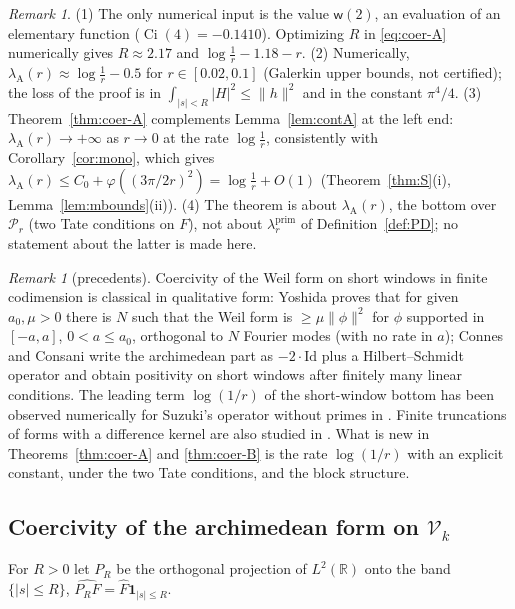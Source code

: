 \documentclass[11pt]{amsart}
\theoremstyle{definition}
\theoremstyle{remark}
\newtheorem{remark}[theorem]{Remark}
\newcommand{\R}{\mathbb R}
\newcommand{\Fh}{\widehat F}
\begin{document}
\begin{remark}\label{rem:coer-A}
(1) The only numerical input is the value $\mathsf w(2)$, an evaluation of an elementary function
($\operatorname{Ci}(4)=-0.1410$). Optimizing $R$ in \eqref{eq:coer-A} numerically gives $R\approx2.17$ and
$\log\frac1r-1.18-r$. (2) Numerically, $\lambda_{\mathrm A}(r)\approx\log\frac1r-0.5$ for $r\in[0.02,0.1]$ (Galerkin upper
bounds, not certified); the loss of the proof is in $\int_{|s|<R}|H|^2\le\|h\|^2$ and in the constant $\pi^4/4$.
(3) Theorem~\ref{thm:coer-A} complements Lemma~\ref{lem:contA} at the left end: $\lambda_{\mathrm A}(r)\to+\infty$ as $r\to0$ at
the rate $\log\frac1r$, consistently with Corollary~\ref{cor:mono}, which gives
$\lambda_{\mathrm A}(r)\le C_0+\varphi((3\pi/2r)^2)=\log\frac1r+O(1)$ (Theorem~\ref{thm:S}(i), Lemma~\ref{lem:mbounds}(ii)).
(4) The theorem is about $\lambda_{\mathrm A}(r)$, the bottom over $\mathcal P_r$ (two Tate conditions on $F$), not about
$\lambda^{\mathrm{prim}}_r$ of Definition~\ref{def:PD}; no statement about the latter is made here.
\end{remark}

\begin{remark}[precedents]\label{rem:coer-prec}
Coercivity of the Weil form on short windows in finite codimension is classical in qualitative form: Yoshida
\cite[Lemma~3]{Yoshida1992} proves that for given $a_0,\mu>0$ there is $N$ such that the Weil form is $\ge\mu\|\phi\|^2$ for
$\phi$ supported in $[-a,a]$, $0<a\le a_0$, orthogonal to $N$ Fourier modes (with no rate in $a$); Connes and Consani
\cite[Thm.~3.6, Cor.~3.8, Rem.~3.9]{ConnesConsani2021} write the archimedean part as $-2\cdot\mathrm{Id}$ plus a
Hilbert--Schmidt operator and obtain positivity on short windows after finitely many linear conditions. The leading
term $\log(1/r)$ of the short-window bottom has been observed numerically for Suzuki's operator without primes in
\cite{Kim2026}. Finite truncations of forms with a difference kernel are also studied in \cite{CvS2025}. What is new in
Theorems~\ref{thm:coer-A} and \ref{thm:coer-B} is the rate $\log(1/r)$ with an explicit constant, under the two Tate
conditions, and the block structure.
\end{remark}


\subsection{Coercivity of the archimedean form on $\mathcal V_k$}\label{subsec:coer-B}
For $R>0$ let $P_R$ be the orthogonal projection of $L^2(\R)$ onto the band $\{|s|\le R\}$,
$\widehat{P_RF}=\Fh\mathbf 1_{|s|\le R}$.
\end{document}
